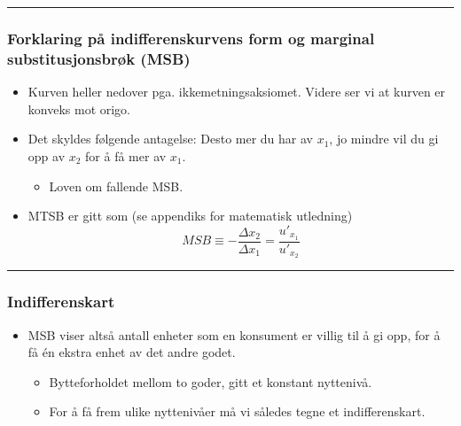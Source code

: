 \documentclass[
  letterpaper,
  DIV=11,
  numbers=noendperiod]{scrartcl}
\providecommand{\tightlist}{%
  \setlength{\itemsep}{0pt}\setlength{\parskip}{0pt}}\usepackage{longtable,booktabs,array}
\begin{document}
\begin{center}\rule{0.5\linewidth}{0.5pt}\end{center}

\subsubsection{Forklaring på indifferenskurvens form og marginal
substitusjonsbrøk
(MSB)}\label{forklaring-puxe5-indifferenskurvens-form-og-marginal-substitusjonsbruxf8k-msb}

\begin{itemize}
\tightlist
\item
  Kurven heller nedover pga. ikkemetningsaksiomet. Videre ser vi at
  kurven er konveks mot origo.
\item
  Det skyldes følgende antagelse: Desto mer du har av \(x_1\), jo mindre
  vil du gi opp av \(x_2\) for å få mer av \(x_1\).

  \begin{itemize}
  \tightlist
  \item
    Loven om fallende MSB.
  \end{itemize}
\item
  MTSB er gitt som (se appendiks for matematisk utledning)
  \begin{equation*}
  MSB\equiv - \frac{\Delta x_{2}}{\Delta x_{1}}  = \frac{u'_{x_{1}}}{u'_{x_{2}}}
  \end{equation*}
\end{itemize}

\begin{center}\rule{0.5\linewidth}{0.5pt}\end{center}

\subsubsection{Indifferenskart}\label{indifferenskart}

\begin{itemize}
\tightlist
\item
  MSB viser altså antall enheter som en konsument er villig til å gi
  opp, for å få én ekstra enhet av det andre godet.

  \begin{itemize}
  \tightlist
  \item
    Bytteforholdet mellom to goder, gitt et konstant nyttenivå.
  \item
    For å få frem ulike nyttenivåer må vi således tegne et
    indifferenskart.
  \end{itemize}
\end{itemize}
\end{document}
